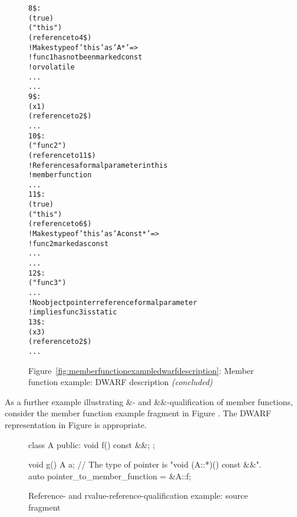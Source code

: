 \begin{figure}[p]
\begin{dwflisting}
\begin{alltt}

8\$:         \DWTAGformalparameter
                \DWATartificial(true)
                \DWATname("this")
                \DWATtype(reference to 4\$)
                    ! Makes type of 'this' as 'A*' =>
                    ! func1 has not been marked const 
                    ! or volatile
                \DWATlocation ...
                ...
9\$:         \DWTAGformalparameter
                \DWATname(x1)
                \DWATtype(reference to 2\$)
                ...
10\$:    \DWTAGsubprogram
            \DWATdeclaration
            \DWATname("func2")
            \DWATobjectpointer(reference to 11\$) 
            ! References a formal parameter in this 
            ! member function
            ...
11\$:        \DWTAGformalparameter
                \DWATartificial(true)
                \DWATname("this")
                \DWATtype(reference to 6\$)
                ! Makes type of 'this' as 'A const*' =>
                !     func2 marked as const
                \DWATlocation ...
                ...
12\$:    \DWTAGsubprogram
            \DWATdeclaration
            \DWATname("func3")
            ...
                ! No object pointer reference formal parameter
                ! implies func3 is static
13\$:        \DWTAGformalparameter
                \DWATname(x3)
                \DWATtype(reference to 2\$)
                ...

\end{alltt}
\end{dwflisting}
\begin{center}
\vspace{3mm}
Figure~\ref{fig:memberfunctionexampledwarfdescription}: Member function example: DWARF description \textit{(concluded)}
\end{center}
\end{figure}

\clearpage
As a further example illustrating \&- and \&\&-qualification
of member functions, 
consider the member function example fragment in 
Figure .
The DWARF representation in 
Figure 
is appropriate.

\begin{figure}[ht]
\begin{nlnlisting}
class A {
public:
    void f() const &&;
};
   
void g() {
    A a;
    // The type of pointer is "void (A::*)() const &&".
    auto pointer_to_member_function = &A::f;
}
\end{nlnlisting}
\caption{Reference- and rvalue-reference-qualification example: source \mbox{fragment}}
\label{fig:memberfunctionrefqualexamplesourcefragment}
\end{figure}

